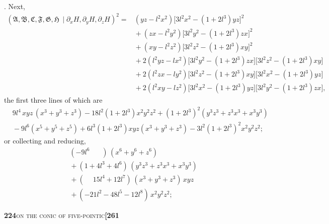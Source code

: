 \documentclass[11pt]{article}
\newcommand{\Cdel}{\mid}
\begin{document}
. Next,
\[
\begin{aligned}
(\mathfrak{A}, \mathfrak{B}, \mathfrak{C}, \mathfrak{F}, \mathfrak{G}, \mathfrak{H}\,\Cdel\partial_x H, \partial_y H, \partial_z H)^2
={}& (yz - l^2 x^2)\bigl[3l^2 x^2 - (1 + 2l^3)yz\bigr]^2\\
&{}+ (zx - l^2 y^2)\bigl[3l^2 y^2 - (1 + 2l^3)zx\bigr]^2\\
&{}+ (xy - l^2 z^2)\bigl[3l^2 z^2 - (1 + 2l^3)xy\bigr]^2\\
&{}+ 2(l^2 yz - lx^2)\bigl[3l^2 y^2 - (1 + 2l^3)zx\bigr]\bigl[3l^2 z^2 - (1 + 2l^3)xy\bigr]\\
&{}+ 2(l^2 zx - ly^2)\bigl[3l^2 z^2 - (1 + 2l^3)xy\bigr]\bigl[3l^2 x^2 - (1 + 2l^3)yz\bigr]\\
&{}+ 2(l^2 xy - lz^2)\bigl[3l^2 x^2 - (1 + 2l^3)yz\bigr]\bigl[3l^2 y^2 - (1 + 2l^3)zx\bigr],
\end{aligned}
\]
the first three lines of which are
\[
\begin{aligned}
&9l^4\,xyz\,(x^3 + y^3 + z^3) - 18l^2(1 + 2l^3)x^2y^2z^2 + (1 + 2l^3)^2(y^3z^3 + z^3x^3 + x^3y^3)\\
&{}- 9l^6(x^5 + y^5 + z^5) + 6l^3(1 + 2l^3)xyz(x^3 + y^3 + z^3) - 3l^2(1 + 2l^3)^2 x^2y^2z^2;
\end{aligned}
\]
or collecting and reducing,
\[
\begin{aligned}
& (-9l^6\phantom{xxx})\,(x^6 + y^6 + z^6)\\
&{}+ (1 + 4l^3 + 4l^6)\,(y^3z^3 + z^3x^3 + x^3y^3)\\
&{}+ (\phantom{-}15l^4 + 12l^7)\,(x^3 + y^3 + z^3)\,xyz\\
&{}+ (-21l^2 - 48l^5 - 12l^8)\,x^2y^2z^2;
\end{aligned}
\]

\newpage

\noindent\textbf{224}\hfill\textsc{on the conic of five-pointic}\hfill\textbf{[261}

\medskip
\end{document}

